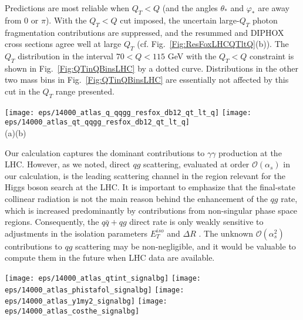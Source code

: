 \documentclass[12pt,english,aps,preprint,prd,letterpaper,fleqn,nofootinbib,showpacs,showkeys,tightenlines,floatfix]{revtex4}
\begin{document}
{Predictions are most reliable when $Q_{T}<Q$ (and the angles 
$\theta_*$ and $\varphi_*$ are away from 0 or $\pi$). 
With the $Q_{T}<Q$ cut imposed, the uncertain  large-$Q_T$ 
photon fragmentation contributions 
are suppressed, and the resummed and
DIPHOX cross sections  agree well at large $Q_T$
(cf. Fig.~\ref{Fig:ResFoxLHCQTltQ}(b)). The $Q_T$
distribution  in the interval $70 < Q <
115 $ GeV with the  $Q_{T}<Q$ constraint 
is shown in Fig.~\ref{Fig:QTinQBinsLHC} by a dotted
curve. Distributions in the other two mass bins in  
Fig.~\ref{Fig:QTinQBinsLHC} are essentially not affected by this cut
in the $Q_T$ range presented. 


\begin{figure*}
\texttt{[image: eps/14000\_atlas\_q\_qqgg\_resfox\_db12\_qt\_lt\_q]}
\texttt{[image: eps/14000\_atlas\_qt\_qqgg\_resfox\_db12\_qt\_lt\_q]}\\
(a)\hspace{3in}(b)

\caption{Invariant mass and transverse momentum distributions
from our resummed, NLO, and DIPHOX calculations at the LHC,
with the $Q_T < Q$ constraint imposed.}

\label{Fig:ResFoxLHCQTltQ} 
\end{figure*}



Our calculation captures the dominant contributions to $\gamma\gamma$
production at the LHC. However, as we noted, direct $qg$ scattering,
evaluated at order ${\mathcal{O}}(\alpha_{s})$ in our calculation,
is the leading scattering channel in the region relevant 
for the Higgs boson search at the LHC.
It is important to emphasize that the final-state collinear radiation
is not the main reason behind the enhancement of the $qg$ rate, which
is increased predominantly by contributions from non-singular phase
space regions. Consequently, the $q\bar{q}+qg$ direct rate is only
weakly sensitive to adjustments in the isolation parameters $E_{T}^{iso}$
and $\Delta R$ \cite{Bern:2002jx}. The unknown ${\mathcal{O}}(\alpha_{s}^{2})$
contributions to $qg$ scattering may be non-negligible, and it would
be valuable to compute them in the future when LHC data are available.

\begin{figure*}
\texttt{[image: eps/14000\_atlas\_qtint\_signalbg]}
\texttt{[image: eps/14000\_atlas\_phistafol\_signalbg]}
\texttt{[image: eps/14000\_atlas\_y1my2\_signalbg]}
\texttt{[image: eps/14000\_atlas\_costhe\_signalbg]}



\end{figure*}}
\end{document}
